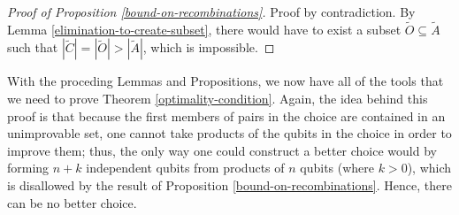 \documentclass[twocolumn,showpacs,preprintnumbers,amsmath,amssymb,nofootinbib,pra,floatfix]{revtex4-1}
\newenvironment{remark}[1][Remark]{\begin{trivlist}
\item[\hskip \labelsep {\bfseries #1}]}{\end{trivlist}}
\newcommand{\set}{\tilde}
\begin{document}
\begin{proof}[Proof of Proposition \ref{bound-on-recombinations}]
Proof by contradiction.  By Lemma \ref{elimination-to-create-subset}, there would have to exist a subset $\set O\subseteq\set A$ such that $|\set C|=|\set O|>|\set A|$, which is impossible.
\end{proof}
\begin{remark}
With the proceding Lemmas and Propositions, we now have all of the tools that we need to prove Theorem \ref{optimality-condition}.  Again, the idea behind this proof is that because the first members of pairs in the choice are contained in an unimprovable set, one cannot take products of the qubits in the choice in order to improve them;  thus, the only way one could construct a better choice would by forming $n+k$ independent qubits from products of $n$ qubits (where $k>0$), which is disallowed by the result of Proposition \ref{bound-on-recombinations}.  Hence, there can be no better choice.
\end{remark}
\end{document}
